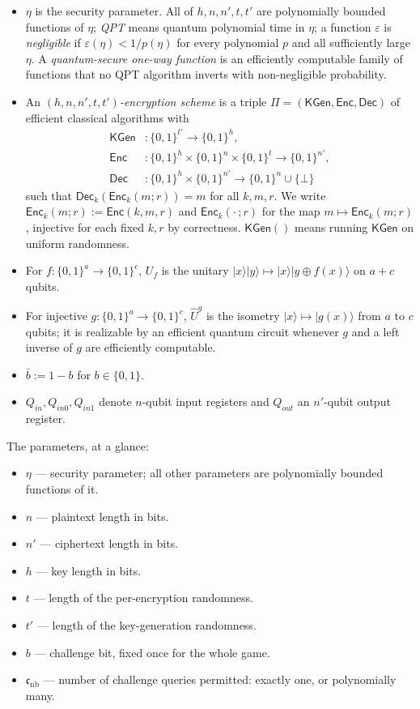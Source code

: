 \documentclass{aicr-conjecture}
\newcommand{\KGen}{\mathsf{KGen}}
\newcommand{\Enc}{\mathsf{Enc}}
\newcommand{\Dec}{\mathsf{Dec}}
\newcommand{\cnb}{\mathfrak{c}_{\mathrm{nb}}}
\newcommand{\ket}[1]{|#1\rangle}
\begin{document}
\begin{itemize}
  \item $\eta$ is the security parameter. All of $h,n,n',t,t'$ are
    polynomially bounded functions of $\eta$; \emph{QPT} means quantum
    polynomial time in $\eta$; a function $\varepsilon$ is
    \emph{negligible} if $\varepsilon(\eta)<1/p(\eta)$ for every
    polynomial $p$ and all sufficiently large $\eta$. A
    \emph{quantum-secure one-way function} is an efficiently computable
    family of functions that no QPT algorithm inverts with
    non-negligible probability.
  \item An \emph{$(h,n,n',t,t')$-encryption scheme} is a triple
    $\Pi=(\KGen,\Enc,\Dec)$ of efficient classical algorithms with
    \begin{align*}
      \KGen&\colon\{0,1\}^{t'}\to\{0,1\}^{h},\\
      \Enc&\colon\{0,1\}^{h}\times\{0,1\}^{n}\times\{0,1\}^{t}
        \to\{0,1\}^{n'},\\
      \Dec&\colon\{0,1\}^{h}\times\{0,1\}^{n'}
        \to\{0,1\}^{n}\cup\{\bot\}
    \end{align*}
    such that $\Dec_k(\Enc_k(m;r))=m$ for all $k,m,r$. We write
    $\Enc_k(m;r):=\Enc(k,m,r)$ and $\Enc_k(\cdot\,;r)$ for the map
    $m\mapsto\Enc_k(m;r)$, injective for each fixed $k,r$ by
    correctness. $\KGen()$ means running $\KGen$ on uniform randomness.
  \item For $f:\{0,1\}^{a}\to\{0,1\}^{c}$, $U_f$ is the unitary
    $\ket{x}\ket{y}\mapsto\ket{x}\ket{y\oplus f(x)}$ on $a+c$ qubits.
  \item For injective $g:\{0,1\}^{a}\to\{0,1\}^{c}$, $\hat U^{g}$ is the
    isometry $\ket{x}\mapsto\ket{g(x)}$ from $a$ to $c$ qubits; it is
    realizable by an efficient quantum circuit whenever $g$ and a left
    inverse of $g$ are efficiently computable.
  \item $\bar b:=1-b$ for $b\in\{0,1\}$.
  \item $Q_{in},Q_{in0},Q_{in1}$ denote $n$-qubit input registers and
    $Q_{out}$ an $n'$-qubit output register.
\end{itemize}

The parameters, at a glance:

\begin{itemize}
  \item $\eta$ --- security parameter; all other parameters are
    polynomially bounded functions of it.
  \item $n$ --- plaintext length in bits.
  \item $n'$ --- ciphertext length in bits.
  \item $h$ --- key length in bits.
  \item $t$ --- length of the per-encryption randomness.
  \item $t'$ --- length of the key-generation randomness.
  \item $b$ --- challenge bit, fixed once for the whole game.
  \item $\cnb$ --- number of challenge queries permitted: exactly one,
    or polynomially many.
\end{itemize}
\end{document}
